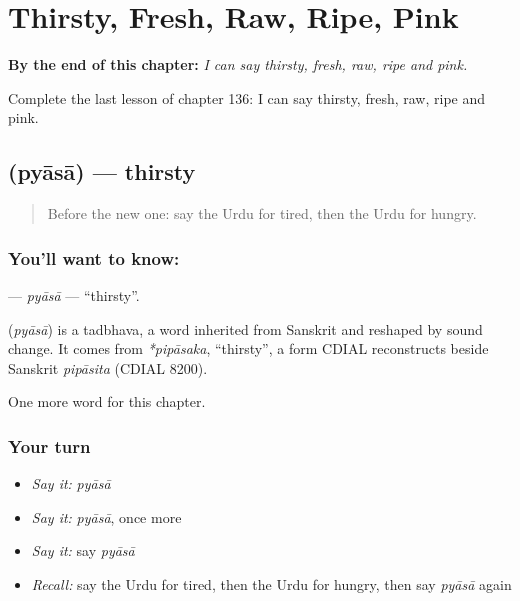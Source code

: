 
\chapter{Thirsty, Fresh, Raw, Ripe, Pink}
\label{ch:ur-thirsty-fresh-raw-ripe-pink}

\begin{chapteropening}
\textbf{By the end of this chapter:} \emph{I can say thirsty, fresh, raw, ripe and pink.}

Complete the last lesson of chapter 136: I can say thirsty, fresh, raw, ripe and pink.
\end{chapteropening}

\section[\texorpdfstring{\ur{پیاسا} (pyāsā)}{پیاسا (pyāsā)}]{ (pyāsā) — thirsty}

\label{lesson:UR-C136-pyasa}



\begin{quote}
Before the new one: say the Urdu for tired, then the Urdu for hungry.
\end{quote}

\subsection*{You'll want to know: }
\textbf{} — \emph{pyāsā} — \textquotedblleft{}thirsty\textquotedblright{}.

\begin{cousinweb}
\textbf{} (\emph{pyāsā}) is a tadbhava, a word inherited from Sanskrit and reshaped by sound change. It comes from \emph{*pipāsaka}, \textquotedblleft{}thirsty\textquotedblright{}, a form CDIAL reconstructs beside Sanskrit \emph{pipāsita} (CDIAL 8200).
\end{cousinweb}

\begin{grammarlens}[title={What you've built}]
One more word for this chapter.
\end{grammarlens}

\subsection*{Your turn}
\begin{itemize}
\raggedright
  \item \emph{Say it:} \emph{pyāsā}
  \item \emph{Say it:} \emph{pyāsā}, once more
  \item \emph{Say it:} say \emph{pyāsā}
  \item \emph{Recall:} say the Urdu for tired, then the Urdu for hungry, then say \emph{pyāsā} again
\end{itemize}

